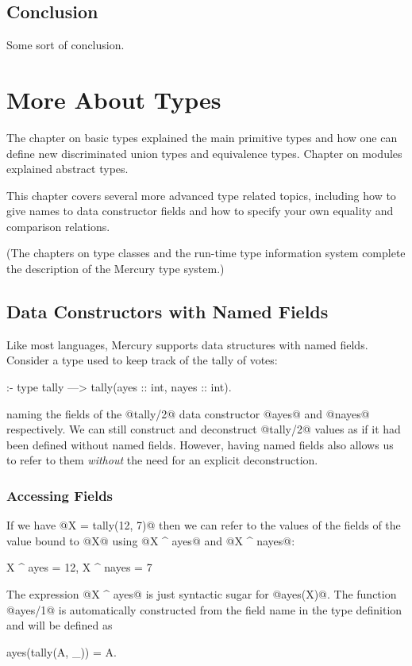
\section{Conclusion}

Some sort of conclusion.



\chapter{More About Types}


The chapter on basic types \XXX{} explained the main primitive
types and how one can define new discriminated union types and equivalence
types.  Chapter \XXX{} on modules explained abstract types.

This chapter covers several more advanced type related topics, including how
to give names to data constructor fields and how to specify your own
equality and comparison relations.

(The chapters on type classes \XXX{} and the run-time type information
system \XXX{} complete the description of the Mercury type system.)

\section{Data Constructors with Named Fields}

Like most languages, Mercury supports data structures with named fields.
Consider a type used to keep track of the tally of votes:
\begin{myverbatim}
:- type tally ---> tally(ayes :: int, nayes :: int).
\end{myverbatim}
naming the fields of the @tally/2@ data constructor @ayes@ and
@nayes@ respectively.  We can still construct and deconstruct @tally/2@
values as if it had been defined without named fields.  However, having
named fields also allows us to refer to them \emph{without} the need for an
explicit deconstruction.

\subsection{Accessing Fields}

If we have @X = tally(12, 7)@ then we can refer to the values of the fields
of the value bound to @X@ using @X ^ ayes@ and @X ^ nayes@:
\begin{myverbatim}
    X ^ ayes  = 12,
    X ^ nayes =  7
\end{myverbatim}
The expression @X ^ ayes@ is just syntactic sugar for @ayes(X)@.  The
function @ayes/1@ is automatically constructed from the field name in the
type definition and will be defined as
\begin{myverbatim}
ayes(tally(A, _)) = A.
\end{myverbatim}

